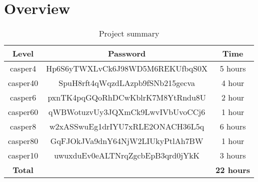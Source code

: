 \section{Overview}
\begin{table}[h]
	\centering
	\begin{tabular}{|c|c|c|}
		\hline
		\textbf{Level} & \textbf{Password} 								& \textbf{Time} \\ \hline
		casper4        & Hp6S6yTWXLvCk6J98WD5M6REKUfbqS0X               & 5 hours       \\ \hline
		casper40       & SpuH8rft4qWqzdLAzpb9fSNb215gecva				& 4 hour        \\ \hline
		casper6        & pxnTK4pqGQoRhDCwKblrK7M8YtRndu8U				& 2 hour        \\ \hline
		casper60       & qWBWotuzvUy3JQXmCk9LwvIVbUvoCCj6				& 1 hour	    \\ \hline
		casper8		   & w2xASSwuEg1drIYU7xRLE2ONACH36L5q				& 6 hours		\\ \hline
		casper80	   & GqFJOkJVa9dnY64NjW2LIUkyPtlAh7BW				& 1 hour		\\ \hline
		casper10	   & uwuxduEv0eALTNrqZgcbEpB3qrd0jYkK				& 3 hours		\\ \hline
		\textbf{Total} &												& \textbf{22 hours} \\ \hline
	\end{tabular}
	\caption{Project summary}
	\label{tbl:summary}
\end{table}